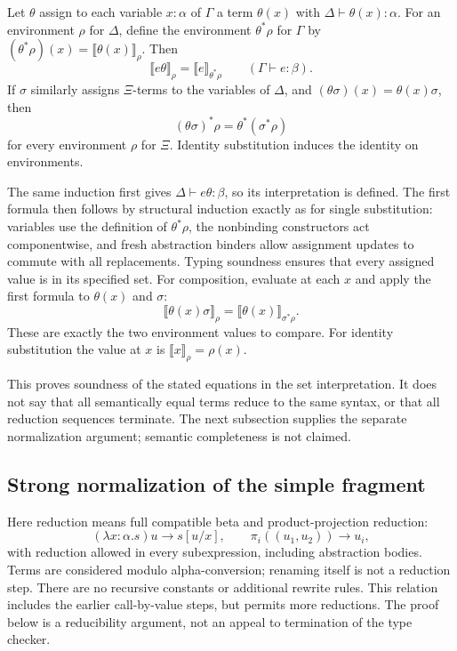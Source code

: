 \begin{proposition}
Let $\theta$ assign to each variable $x:\alpha$ of $\Gamma$ a term
$\theta(x)$ with $\Delta\vdash\theta(x):\alpha$. For an environment
$\rho$ for $\Delta$, define the environment $\theta^*\rho$ for $\Gamma$
by $(\theta^*\rho)(x)=\llbracket\theta(x)\rrbracket_\rho$. Then
\[
\llbracket e\theta\rrbracket_\rho
 =\llbracket e\rrbracket_{\theta^*\rho}
 \qquad(\Gamma\vdash e:\beta).
\]
If $\sigma$ similarly assigns $\Xi$-terms to the variables of $\Delta$,
and $(\theta\sigma)(x)=\theta(x)\sigma$, then
\[
(\theta\sigma)^*\rho=\theta^*(\sigma^*\rho)
\]
for every environment $\rho$ for $\Xi$. Identity substitution induces
the identity on environments.
\end{proposition}
\Proof
The same induction first gives $\Delta\vdash e\theta:\beta$, so its
interpretation is defined. The first formula then follows by structural
induction exactly as for single substitution: variables use the definition of $\theta^*\rho$, the
nonbinding constructors act componentwise, and fresh abstraction binders
allow assignment updates to commute with all replacements. Typing
soundness ensures that every assigned value is in its specified set.
For composition, evaluate at each $x$ and apply the first formula to
$\theta(x)$ and $\sigma$:
\[
\llbracket\theta(x)\sigma\rrbracket_\rho
 =\llbracket\theta(x)\rrbracket_{\sigma^*\rho}.
\]
These are exactly the two environment values to compare. For identity
substitution the value at $x$ is $\llbracket x\rrbracket_\rho=\rho(x)$.
\Done

This proves soundness of the stated equations in the set interpretation.
It does not say that all semantically equal terms reduce to the same
syntax, or that all reduction sequences terminate. The next subsection supplies
the separate normalization argument; semantic completeness is not claimed.

\subsection{Strong normalization of the simple fragment}
Here reduction means full compatible beta and product-projection reduction:
\[
(\lambda x:\alpha.s)u\longrightarrow s[u/x],\qquad
\pi_i((u_1,u_2))\longrightarrow u_i,
\]
with reduction allowed in every subexpression, including abstraction
bodies. Terms are considered modulo alpha-conversion; renaming itself is
not a reduction step. There are no recursive constants or additional
rewrite rules. This relation includes the earlier call-by-value steps,
but permits more reductions. The proof below is a reducibility argument,
not an appeal to termination of the type checker.

